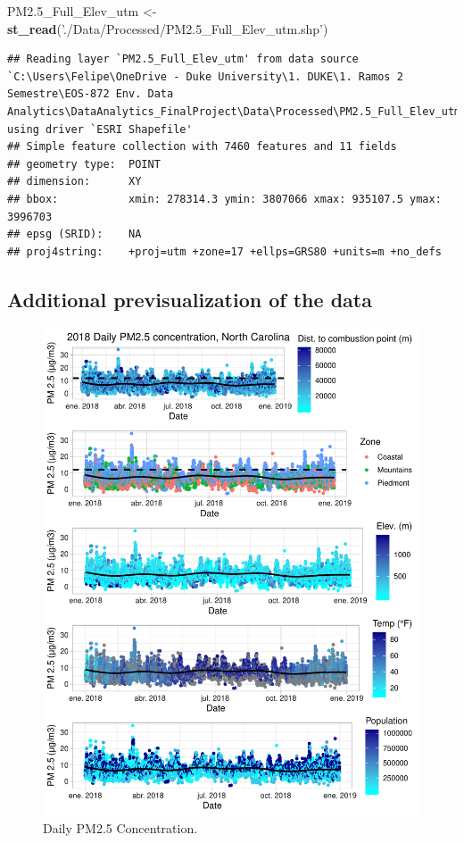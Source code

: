 \documentclass[12pt,]{article}
\newenvironment{Shaded}{\begin{snugshade}}{\end{snugshade}}
\newcommand{\KeywordTok}[1]{\textcolor[rgb]{0.13,0.29,0.53}{\textbf{#1}}}
\newcommand{\StringTok}[1]{\textcolor[rgb]{0.31,0.60,0.02}{#1}}
\newcommand{\NormalTok}[1]{#1}
\begin{document}
\begin{Shaded}
\begin{Highlighting}[]
\NormalTok{PM2.5_Full_Elev_utm <-}\StringTok{ }\KeywordTok{st_read}\NormalTok{(}\StringTok{'./Data/Processed/PM2.5_Full_Elev_utm.shp'}\NormalTok{) }
\end{Highlighting}
\end{Shaded}

\begin{verbatim}
## Reading layer `PM2.5_Full_Elev_utm' from data source `C:\Users\Felipe\OneDrive - Duke University\1. DUKE\1. Ramos 2 Semestre\EOS-872 Env. Data Analytics\DataAnalytics_FinalProject\Data\Processed\PM2.5_Full_Elev_utm.shp' using driver `ESRI Shapefile'
## Simple feature collection with 7460 features and 11 fields
## geometry type:  POINT
## dimension:      XY
## bbox:           xmin: 278314.3 ymin: 3807066 xmax: 935107.5 ymax: 3996703
## epsg (SRID):    NA
## proj4string:    +proj=utm +zone=17 +ellps=GRS80 +units=m +no_defs
\end{verbatim}

\subsection{Additional previsualization of the
data}\label{additional-previsualization-of-the-data}

\begin{figure}
\centering
\includegraphics{Raby_ENV872_Project_files/figure-latex/unnamed-chunk-39-1.pdf}
\caption{Daily PM2.5 Concentration. \label{PM25plot}}
\end{figure}
\end{document}
